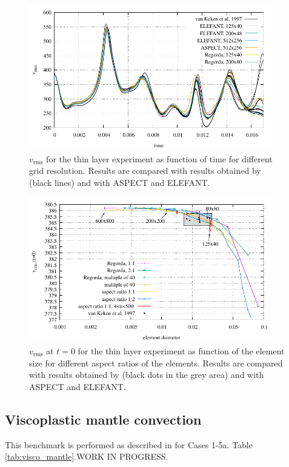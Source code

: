 \documentclass[hidelinks,10pt,a4paper]{article}
\begin{document}
\begin{figure}
\centering
\noindent\includegraphics[width=400px]{./Figures/vrms_thin.pdf}
\caption{$v_{\textrm{rms}}$ for the thin layer experiment as function of time for different grid resolution. Results are compared with results obtained by
\citet{vanKeken1997} (black lines) and with ASPECT and ELEFANT.}
\label{fig:thin}
\end{figure}

\begin{figure}
\centering
\noindent\includegraphics[width=400px]{./Figures/vrmszero.pdf}
\caption{$v_{\textrm{rms}}$ at $t=0$ for the thin layer experiment as function of the element size for different aspect ratios of the elements. Results are compared
with results obtained by \citet{vanKeken1997} (black dots in the grey area) and with ASPECT and ELEFANT.}
\label{fig:thin_initial}
\end{figure}

\subsection{Viscoplastic mantle convection}\label{sec:visco_mantle}
This benchmark is performed as described in \citet{Tosi2015} for Cases 1-5a. Table \ref{tab:visco_mantle}.WORK IN PROGRESS.
\end{document}
